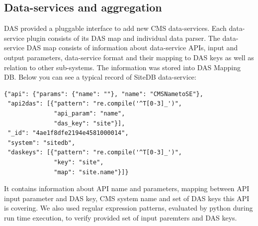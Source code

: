 \documentclass[a4paper]{jpconf}
\begin{document}
\subsection{Data-services and aggregation}
DAS provided a pluggable interface to add new CMS data-services. 
Each data-service plugin consists of its DAS map and individual data parser. 
The data-service DAS map consists of information about data-service APIs,
input and output parameters, data-service
format and their mapping to DAS keys as well as relation to other sub-systems. 
The information was stored into DAS Mapping DB. Below you can see a typical
record of SiteDB \cite{SiteDB} data-service:
\begin{verbatim}
{"api": {"params": {"name": ""}, "name": "CMSNametoSE"}, 
 "api2das": [{"pattern": "re.compile('^T[0-3]_')", 
              "api_param": "name", 
              "das_key": "site"}], 
 "_id": "4ae1f8dfe2194e4581000014", 
 "system": "sitedb", 
 "daskeys": [{"pattern": "re.compile('^T[0-3]_')", 
              "key": "site", 
              "map": "site.name"}]}
\end{verbatim}
It contains information about API name and parameters, mapping between API input
parameter and DAS key, CMS system name and set of DAS keys this API is covering.
We also used regular expression patterns, evaluated by python during run time
execution, to verify provided set of input paremters and DAS keys.
\end{document}
